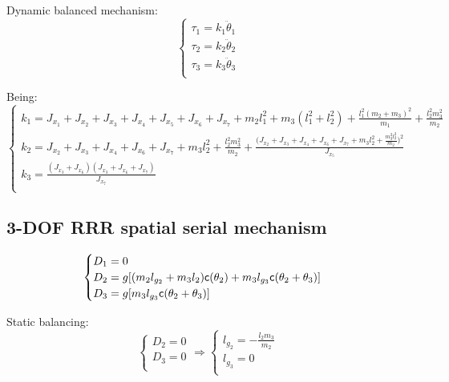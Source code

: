 \documentclass[a4paper,11pt,brazil,fleqn]{article}
\begin{document}
Dynamic balanced mechanism:
\begin{equation}
\begin{cases}
\tau_1 = k_1 \ddot{\theta}_1 \\
\tau_2 = k_2 \ddot{\theta}_2 \\
\tau_3 = k_3 \ddot{\theta}_3 \\
\end{cases}
\end{equation}

Being:
\begin{equation}
\begin{cases}
k_1 = J_{x_1} + J_{x_2} + J_{x_3} + J_{x_4} + J_{x_5} + J_{x_6} + J_{x_7} + m_2 l_1^2 + m_3 (l_1^2 + l_2^2) + \frac{l_1^2 (m_2 + m_3)^2}{m_1} + \frac{l_2^2 m_3^2}{m_2} \\
k_2 = J_{x_2} + J_{x_3} + J_{x_4} + J_{x_6} + J_{x_7} + m_3 l_2^2 + \frac{l_2^2 m_3^2}{m_2} + \frac{\big(J_{x_2} + J_{x_3} + J_{x_4} + J_{x_6} + J_{x_7} + m_3 l_2^2 + \frac{m_3^2 l_2^2}{m_2}\big)^2}{J_{x_5}} \\
k_3 = \frac{(J_{x_3}+J_{x_6})(J_{x_3}+J_{x_6}+J_{x_7})}{J_{x_7}} \\
\end{cases}
\end{equation}

\subsection{3-DOF RRR spatial serial mechanism} \label{S03-2}

\begin{equation}
\begin{cases}
D_1 = 0 \\
D_2 = g[ (m_2 l_{g_2} + m_3 l_2  ) \mathsf{c}(\theta_2) + m_3 l_{g_3} \mathsf{c}(\theta_2 + \theta_3) ]  \\
D_3 = g[ m_3 l_{g_3} \mathsf{c}(\theta_2 + \theta_3)  ] \\
\end{cases}
\end{equation} 

Static balancing:
\begin{equation}
\begin{cases}
D_2 = 0 \\
D_3 = 0 \\
\end{cases}
\Rightarrow
\begin{cases}
l_{g_2} = -\frac{l_2 m_3}{m_2} \\
l_{g_3} = 0 \\
\end{cases}
\end{equation}
\end{document}

